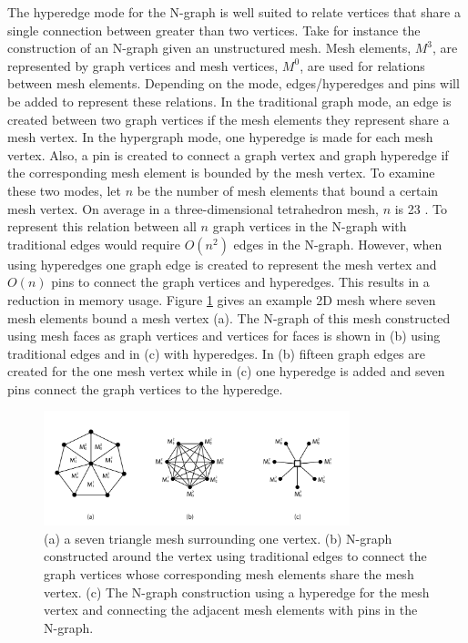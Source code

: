 The hyperedge mode for the
N-graph is well suited to relate vertices that share a single connection
between greater than two vertices. Take for instance the construction of
an N-graph given an
unstructured mesh. Mesh elements, $M^3$, are represented
by graph vertices and mesh vertices, $M^0$, are used for
relations between mesh elements. Depending on the mode, edges/hyperedges and
pins will be added to represent these relations. In the
traditional graph mode, an edge is created between two
graph vertices if the mesh elements they represent share a mesh
vertex. In the hypergraph mode, one hyperedge is made for
each mesh vertex. Also, a pin is created to connect a
graph vertex and graph hyperedge if the corresponding mesh
element is bounded by the mesh vertex. To examine these two modes, let
$n$ be the number of mesh elements that bound a certain mesh vertex. On average
in a three-dimensional tetrahedron mesh, $n$ is 23 \cite{beall1997general}. To
represent this relation between all $n$ graph vertices in the N-graph with
traditional edges would require $O(n^2)$ edges in the N-graph. However, when
using hyperedges one
graph edge is created to represent the mesh vertex and $O(n)$ pins to connect
the graph vertices and hyperedges. This results in a reduction in memory usage.
Figure \ref{fig:edgecounts} gives an example 2D mesh
where seven mesh elements bound a mesh vertex (a). The
N-graph of this mesh constructed using mesh faces
as graph vertices and vertices for faces is shown in
(b) using traditional edges and in (c) with hyperedges.
In (b) fifteen graph edges are created for the one mesh
vertex while in (c) one hyperedge is added and seven
pins connect the graph vertices to the hyperedge.

\begin{figure}[!ht]
  \centering
  \includegraphics[width=3.5in]{../figures/edgecounts.png}
  \caption{(a) a seven triangle mesh surrounding one vertex. (b) N-graph constructed around the vertex using traditional edges to connect the graph vertices whose corresponding mesh elements share the mesh vertex. (c) The N-graph construction using a hyperedge for the mesh vertex and connecting the adjacent mesh elements with pins in the N-graph.}
  \label{fig:edgecounts}
\end{figure}

